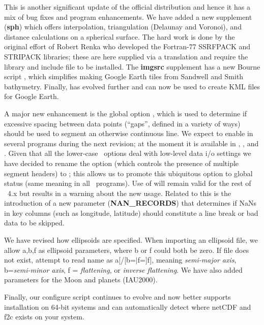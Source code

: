This is another significant update of the official distribution and hence it has a mix of bug fixes
and program enhancements.  We have added a new supplement ({\bf sph}) which
offers interpolation, triangulation (Delaunay and Voronoi), and distance calculations on a 
spherical surface.  The hard work is done by the original effort of Robert Renka who developed
the Fortran-77 SSRFPACK and STRIPACK libraries; these are here supplied via a 
translation and require the  library and include file to be installed.
The {\bf imgsrc} supplement has a new Bourne script , which simplifies
making Google Earth tiles from Sandwell and Smith bathymetry.
Finally,  has evolved further and can now be used to create KML files for Google Earth.

A major new enhancement is the global option , which is used to determine if excessive spacing
between data points (``gaps'', defined in a variety of ways) should be used to segment an otherwise continuous
line.  We expect to enable  in several programs during the next revision; at the moment it is
available in , ,  and .
Given that all the lower-case \gmt\ options deal with low-level data i/o settings we have decided
to rename the  option (which controls the presence of multiple segment headers) to ; this
allows us to promote this ubiquitous option to global status (same meaning in all \gmt\ programs).
Use of  will remain valid for the rest of \gmt\ 4.x but results in a warning about the new usage.
Related to this is the introduction of a new parameter ({\bf NAN\_RECORDS}) that determines if NaNs in
key columns (such as longitude, latitude) should constitute a line break or bad data to be skipped.

We have revised how ellipsoids are specified.  When importing an ellipsoid file, we allow a,b,f as ellipsoid parameters,
where b or f could both be zero.  If file does not exist, attempt to read name as a[/[b=$|$f=]f],
meaning {\it semi-major axis}, b={\it semi-minor axis}, f = {\it flattening}, or {\it inverse flattening}.  We have also
added parameters for the Moon and planets (IAU2000).

Finally, our configure script continues to evolve and now better supports installation on 64-bit systems and
can automatically detect where netCDF and f2c exists on your system.

